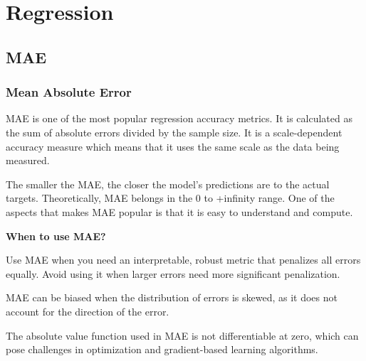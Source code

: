 \chapter{Regression}

\clearpage
\thispagestyle{regressionstyle}
\section{MAE}
\subsection{Mean Absolute Error}

MAE is one of the most popular regression accuracy metrics. It is calculated as the sum of absolute errors divided by the sample size. 
It is a scale-dependent accuracy measure which means that it uses the same scale as the data being measured.

\begin{center}
\end{center}

The smaller the MAE, the closer the model's predictions are to the actual targets.
Theoretically, MAE belongs in the 0 to +infinity range. One of the aspects that makes MAE popular is that it is easy to understand and compute.

\textbf{When to use MAE?}

Use MAE when you need an interpretable, robust metric that penalizes all errors equally.
Avoid using it when larger errors need more significant penalization.

{
    \item MAE can be biased when the distribution of errors is skewed, as it does not account for the direction of the error.
    \item The absolute value function used in MAE is not differentiable at zero, which can pose challenges in optimization
    and gradient-based learning algorithms.
}

